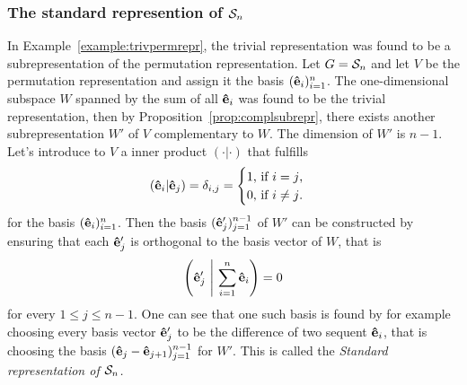 \subsubsection{The standard represention of $\mathcal{S}_n$}

In Example~\ref{example:trivpermrepr}, the trivial representation was found to be a subrepresentation of the permutation representation. Let $G= \mathcal{S}_n$ and let $V$ be the permutation representation and assign it the basis $(\mathbf{\hat{e}}_i)_{i=1}^n$. The one-dimensional subspace $W$ spanned by the sum of all $\mathbf{\hat{e}}_i$ was found to be the trivial representation, then by Proposition~\ref{prop:complsubrepr}, there exists another subrepresentation $W'$ of $V$ complementary to $W$. The dimension of $W'$ is $n-1$. Let's introduce to $V$ a inner product $(\cdot|\cdot)$ that fulfills
\begin{align*}
	(\mathbf{\hat{e}}_i|\mathbf{\hat{e}}_j) = \delta_{i,j} = \begin{cases}
		1 \text{, if $i=j$,}\\
		0 \text{, if $i \neq j$.}
	\end{cases}
\end{align*}
for the basis $(\mathbf{\hat{e}}_i)_{i=1}^n$. Then the basis $(\mathbf{\hat{e}}'_j)_{j=1}^{n-1}$ of $W'$ can be constructed by ensuring that each $\mathbf{\hat{e}}'_j$ is orthogonal to the basis vector of $W$, that is
\begin{align*}
	\left( \mathbf{\hat{e}}'_j \ \middle\vert \ \sum_{i=1}^n \mathbf{\hat{e}}_i \right) = 0
\end{align*}
for every $1 \leq j \leq n-1$. One can see that one such basis is found by for example choosing every basis vector $\mathbf{\hat{e}}'_j$ to be the difference of two sequent $\mathbf{\hat{e}}_i$, that is choosing the basis $(\mathbf{\hat{e}}_j - \mathbf{\hat{e}}_{j+1})_{j=1}^{n-1}$ for $W'$. This is called the \emph{Standard representation of $\mathcal{S}_n$.}

